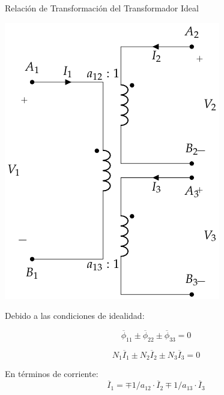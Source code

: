 \documentclass[xcolor={usenames,svgnames,dvipsnames}]{beamer}
\begin{document}
\begin{frame}[label={sec:org39608ba}]{Relación de Transformación del Transformador Ideal}
\begin{center}
\includegraphics[height=0.45\textheight]{../figs/TrafoIdealVariosDevanados.pdf}
\end{center}

Debido a las condiciones de idealidad:

\[
  \overline{\phi}_{11} \pm \overline{\phi}_{22} \pm \overline{\phi}_{33} = 0
\]

\[
  N_1 \overline{I}_1 \pm N_ 2\overline{I}_2 \pm N_3 \overline{I}_{3} = 0
\]

En términos de corriente:
\[
  \boxed{\overline{I}_1 = \mp 1/a_{12} \cdot \overline{I}_2 \mp 1/a_{13} \cdot  \overline{I}_3}
\]
\end{frame}
\end{document}
